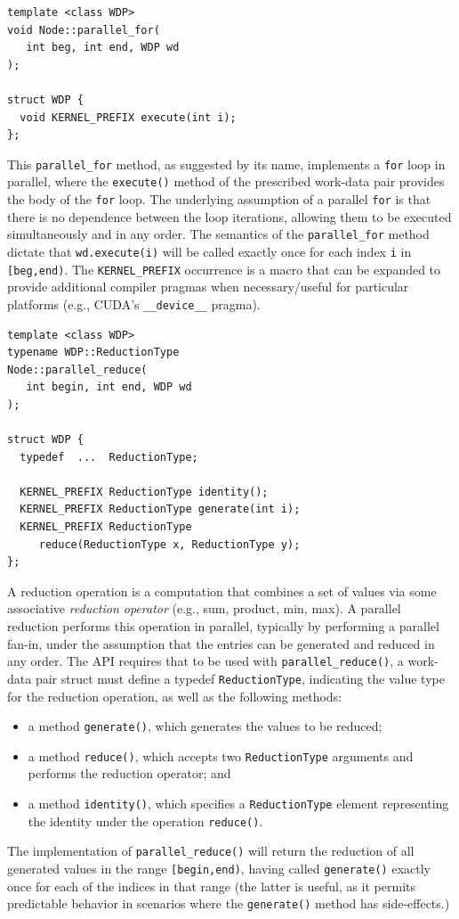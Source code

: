 \documentclass[10pt,conference,letterpaper]{IEEEtran}
\begin{document}
{\small \begin{verbatim}
template <class WDP>
void Node::parallel_for(
   int beg, int end, WDP wd
); 

struct WDP {
  void KERNEL_PREFIX execute(int i);
};
\end{verbatim}}
This \verb!parallel_for! method, as suggested by its name, implements a \verb!for! loop in parallel, where the \verb!execute()! method of the prescribed work-data pair provides the body of the \verb!for! loop. The underlying assumption of a parallel \verb!for!  is that there is no dependence between the loop iterations, allowing them to be executed simultaneously and in any order. The semantics of the \verb!parallel_for! method dictate that \verb!wd.execute(i)! will be called exactly once for each index \verb!i! in \verb![beg,end)!. The \verb!KERNEL_PREFIX! occurrence is a macro that can be expanded to provide additional compiler pragmas when necessary/useful for particular platforms (e.g., CUDA's \verb!__device__! pragma).

{\small \begin{verbatim}
template <class WDP>
typename WDP::ReductionType
Node::parallel_reduce(
   int begin, int end, WDP wd
); 

struct WDP {
  typedef  ...  ReductionType;

  KERNEL_PREFIX ReductionType identity();
  KERNEL_PREFIX ReductionType generate(int i);
  KERNEL_PREFIX ReductionType 
     reduce(ReductionType x, ReductionType y);
};
\end{verbatim}}
A reduction operation is a computation that combines a set of values via some associative \emph{reduction operator} (e.g., sum, product, min, max). A parallel reduction performs this operation in parallel, typically by performing a parallel fan-in, under the assumption that the entries can be generated and reduced in any order. The API requires that to be used with \verb!parallel_reduce()!, a work-data pair struct must define a typedef \verb!ReductionType!, indicating the value type for the reduction operation, as well as the following methods:
\begin{itemize}
\item a method \verb!generate()!, which generates the values to be reduced;
\item  a method \verb!reduce()!, which accepts two \verb!ReductionType! arguments and performs the reduction operator; and
\item a method \verb!identity()!, which specifies a \verb!ReductionType! element representing the identity under the operation \verb!reduce()!.
\end{itemize}The implementation of \verb!parallel_reduce()! will return the reduction of all generated values in the range \verb![begin,end)!, having called \verb!generate()! exactly once for each of the indices in that range (the latter is useful, as it permits predictable behavior in scenarios where the \verb!generate()! method has side-effects.)
\end{document}
